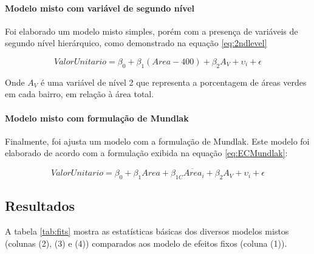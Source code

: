 \documentclass[
  a4paper, 11pt]{article}
\begin{document}
\hypertarget{modelo-misto-com-variuxe1vel-de-segundo-nuxedvel}{%
\paragraph{Modelo misto com variável de segundo
nível}\label{modelo-misto-com-variuxe1vel-de-segundo-nuxedvel}}

Foi elaborado um modelo misto simples, porém com a presença de variáveis
de segundo nível hierárquico, como demonstrado na equação
\ref{eq:2ndlevel}

\begin{equation} \label{eq:2ndlevel}
ValorUnitario = \beta_0 + \beta_1 (Area - 400) + \beta_2 A_V+ \upsilon_i + \epsilon
\end{equation}

Onde \(A_V\) é uma variável de nível 2 que representa a porcentagem de
áreas verdes em cada bairro, em relação à área total.

\hypertarget{modelo-misto-com-formulauxe7uxe3o-de-mundlak}{%
\paragraph{Modelo misto com formulação de
Mundlak}\label{modelo-misto-com-formulauxe7uxe3o-de-mundlak}}

Finalmente, foi ajusta um modelo com a formulação de Mundlak. Este
modelo foi elaborado de acordo com a formulação exibida na equação
\ref{eq:ECMundlak}:

\begin{equation} \label{eq:ECMundlak}
ValorUnitario = \beta_0 + \beta_1 Area + \beta_{1C} \overline{Area}_i + \beta_2 A_V+ \upsilon_i + \epsilon
\end{equation}

\hypertarget{resultados}{%
\subsection{Resultados}\label{resultados}}

A tabela \ref{tab:fits} mostra as estatísticas básicas dos diversos
modelos mistos (colunas (2), (3) e (4)) comparados aos modelo de efeitos
fixos (coluna (1)).
\end{document}
